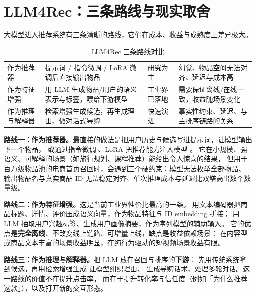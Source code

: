\section{LLM4Rec：三条路线与现实取舍}

大模型进入推荐系统有三条清晰的路线，它们在成本、收益与成熟度上差异极大。

\begin{table}[htbp]
\centering
\caption{LLM4Rec 三条路线对比}
\label{tab:llm4rec}
\small
\begin{tabularx}{\textwidth}{L{2.0cm} L{3.0cm} L{2.6cm} Y}
\toprule
{} &  &  &  \\
\midrule
作为推荐器 & 提示词 / 指令微调 / LoRA 微调后直接输出物品 & 研究为主 & 幻觉、物品空间无法对齐、延迟与成本高 \\
\addlinespace
作为特征增强 & 用 LLM 生成物品/用户的语义表示与标签，喂给下游模型 & 工业界已落地 & 需要保证离线/在线一致，收益随场景变化 \\
\addlinespace
作为推理与解释器 & 检索增强生成候选，再生成理由、做对话式导购 & 快速演进 & 事实性约束、延迟、与主排序链路的关系 \\
\bottomrule
\end{tabularx}
\end{table}

\textbf{路线一：作为推荐器。}最直接的做法是把用户历史与候选写进提示词，让模型输出下一个物品，
或通过指令微调 \cite{ouyang2022instructgpt}、LoRA \cite{hu2021lora} 把推荐能力注入模型 \cite{brown2020gpt3}。
它在小规模、强语义、可解释的场景（如旅行规划、课程推荐）能给出令人惊喜的结果，
但用于百万级物品池的电商首页召回时，会遇到三个硬约束：模型无法枚举全部物品、
输出物品名与真实商品 ID 无法稳定对齐、单次推理成本与延迟比双塔高出数个数量级。

\textbf{路线二：作为特征增强。}这是当前工业界性价比最高的一条。
用文本编码器把商品标题、详情、评价压成语义向量，作为物品特征与 ID embedding 拼接；
用 LLM 抽取用户兴趣标签、生成用户画像摘要，作为序列模型的辅助输入。
它的优点是\textbf{完全离线}、不改变线上链路、可增量上线，缺点是收益依赖场景：
在内容型或商品文本丰富的场景收益明显，在纯行为驱动的短视频场景收益有限。

\textbf{路线三：作为推理与解释器。}把 LLM 放在召回与排序的\textbf{下游}：
先用传统系统拿到候选，再用检索增强生成 \cite{lewis2021rag,gao2023ragsurvey} 让模型组织理由、
生成导购话术、处理多轮对话。这一路线的价值不在提升点击率，
而在于提升转化率与信任度（例如「为什么推荐这款」），以及打开新的交互形态。

